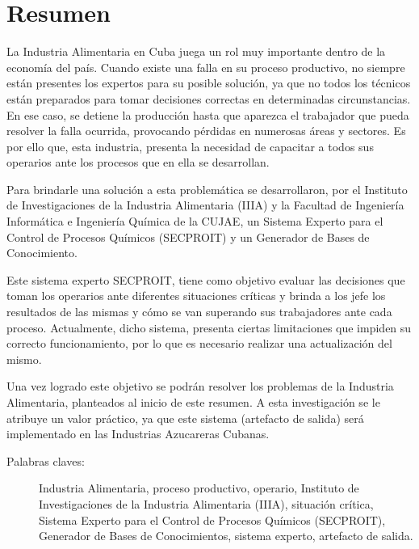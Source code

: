 \section*{Resumen}
La Industria Alimentaria en Cuba juega un rol muy importante dentro de la economía del país. Cuando existe una falla en su proceso productivo, no siempre están presentes los expertos para su posible solución, ya que no todos los técnicos están preparados para tomar decisiones correctas en determinadas circunstancias. En ese caso, se detiene la producción hasta que aparezca el trabajador que pueda resolver la falla ocurrida, provocando pérdidas en numerosas áreas y sectores. Es por ello que, esta industria, presenta la necesidad de capacitar a todos sus operarios ante los procesos que en ella se desarrollan.

Para brindarle una solución a esta problemática se desarrollaron, por el Instituto de Investigaciones de la Industria Alimentaria (IIIA) y la Facultad de Ingeniería Informática e Ingeniería Química de la CUJAE, un Sistema Experto para el Control de Procesos Químicos (SECPROIT) y un Generador de Bases de Conocimiento.

Este sistema experto SECPROIT, tiene como objetivo evaluar las decisiones que toman los operarios ante diferentes situaciones críticas y brinda a los jefe los resultados de las mismas y cómo se van superando sus trabajadores ante cada proceso. Actualmente, dicho sistema, presenta ciertas limitaciones que impiden su correcto funcionamiento, por lo que es necesario realizar una actualización del mismo.

Una vez logrado este objetivo se podrán resolver los problemas de la Industria Alimentaria, planteados al inicio de este resumen. A esta investigación se le atribuye un valor práctico, ya que este sistema (artefacto de salida) será implementado en las Industrias Azucareras Cubanas.

\vfill

\begin{description}
	\item[Palabras claves:]{Industria Alimentaria, proceso productivo, operario, Instituto de Investigaciones de la Industria Alimentaria (IIIA), situación crítica, Sistema Experto para el Control de Procesos Químicos (SECPROIT), Generador de Bases de Conocimientos, sistema experto, artefacto de salida.}
\end{description}



